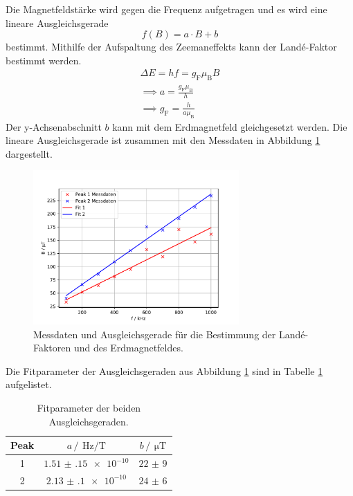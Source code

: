\FloatBarrier
Die Magnetfeldstärke wird gegen die Frequenz aufgetragen und es wird eine lineare Ausgleichsgerade
\begin{equation*}
  \label{eq:lin_fit}
  f(B)=a\cdot B + b
\end{equation*}
bestimmt. 
Mithilfe der Aufspaltung des Zeemaneffekts kann der Landé-Faktor bestimmt werden.
\begin{gather*}
  \Delta E = hf = g_{\text{F}} \mu_{\text{B}} B\\
  \implies a = \frac{g_{\text{F}} \mu_{\text{B}}}{h} \\
  \implies g_{\text{F}} = \frac{h}{a\mu_{\text{B}}}
\end{gather*}
Der y-Achsenabschnitt $b$ kann mit dem Erdmagnetfeld gleichgesetzt werden. Die lineare Ausgleichsgerade ist zusammen mit 
den Messdaten in Abbildung \ref{fig:Fit_Messdaten} dargestellt.
\FloatBarrier
\begin{figure}
  \centering
  \includegraphics[width = 0.7\textwidth,keepaspectratio]{figure/Messdaten_Fit.pdf}
  \caption{Messdaten und Ausgleichsgerade für die Bestimmung der Landé-Faktoren und des Erdmagnetfeldes.}
  \label{fig:Fit_Messdaten}
\end{figure}
\FloatBarrier
Die Fitparameter der Ausgleichsgeraden aus Abbildung \ref{fig:Fit_Messdaten} sind in Tabelle \ref{tab:FitParams} aufgelistet.
\begin{table}
  \centering
  \caption{Fitparameter der beiden Ausgleichsgeraden.}
  \label{tab:FitParams}
  \begin{tabular}{c c c}
    \toprule
    Peak&$a\,/\,\SI{}{\hertz\per\tesla}$&$b \,/\,\SI{}{\micro\tesla}$\\
    \midrule
    1&$\num{1.51(15)e-10}$&$\num{22(9)}$\\
    2&$\num{2.13(10)e-10}$&$\num{24(6)}$\\
    \bottomrule
  \end{tabular}
\end{table}
